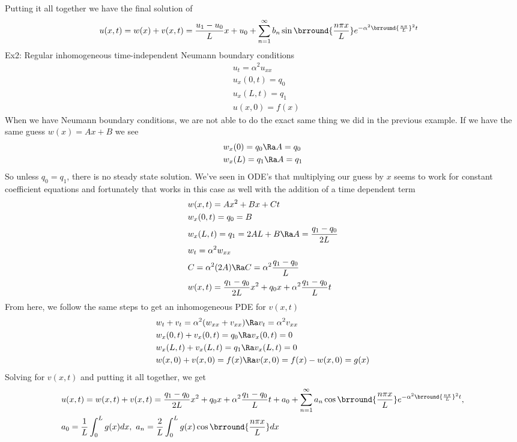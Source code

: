 Putting it all together we have the final solution of
\begin{align*}
    &u(x,t)=w(x)+v(x,t)=\frac{u_1-u_0}{L}x+u_0+\sum_{n=1}^\infty b_n\sin\brround{\frac{n\pi x}{L}}e^{-\alpha^2\brround{\frac{n\pi}{L}}^2t}
\end{align*}
Ex2: Regular inhomogeneous time-independent Neumann boundary conditions
\begin{align*}
    &u_t=\alpha^2 u_{xx}\\
    &u_x(0,t)=q_0\\
    &u_x(L,t)=q_1\\
    &u(x,0)=f(x)
\end{align*}
When we have Neumann boundary conditions, we are not able to do the exact same thing we did in the previous example. If we have the same guess $w(x)=Ax+B$ we see
\begin{align*}
    &w_x(0)=q_0\Ra A=q_0\\
    &w_x(L)=q_1\Ra A=q_1
\end{align*}
So unless $q_0=q_1$, there is no steady state solution. We've seen in ODE's that multiplying our guess by $x$ seems to work for constant coefficient equations and fortunately that works in this case as well with the addition of a time dependent term
\begin{align*}
    &w(x,t)=Ax^2+Bx+Ct\\
    &w_x(0,t)=q_0=B\\
    &w_x(L,t)=q_1=2AL+B\Ra A=\frac{q_1-q_0}{2L}\\
    &w_t=\alpha^2w_{xx}\\
    &C=\alpha^2(2A)\Ra C=\alpha^2\frac{q_1-q_0}{L}\\
    &w(x,t)=\frac{q_1-q_0}{2L}x^2+q_0x+\alpha^2\frac{q_1-q_0}{L}t
\end{align*}
From here, we follow the same steps to get an inhomogeneous PDE for $v(x,t)$
\begin{align*}
    &w_t+v_t=\alpha^2(w_{xx}+v_{xx})\Ra v_t=\alpha^2 v_{xx}\\
    &w_x(0,t)+v_x(0,t)=q_0\Ra v_x(0,t)=0\\
    &w_x(L,t)+v_x(L,t)=q_1\Ra v_x(L,t)=0\\
    &w(x,0)+v(x,0)=f(x)\Ra v(x,0)=f(x)-w(x,0)=g(x)
\end{align*}
Solving for $v(x,t)$ and putting it all together, we get
\begin{align*}
    &u(x,t)=w(x,t)+v(x,t)=\frac{q_1-q_0}{2L}x^2+q_0x+\alpha^2\frac{q_1-q_0}{L}t+a_0+\sum_{n=1}^\infty a_n\cos\brround{\frac{n\pi x}{L}}e^{-\alpha^2\brround{\frac{n\pi }{L}}^2t},\\
    &a_0=\frac{1}{L}\int_0^L g(x)dx,\ a_n=\frac{2}{L}\int_0^L g(x)\cos\brround{\frac{n\pi x}{L}}dx
\end{align*}

